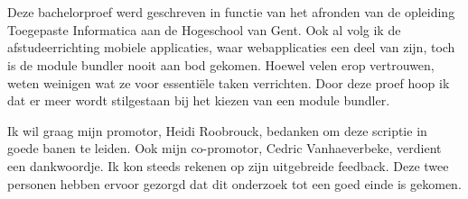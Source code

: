 
\chapter*{}
\label{ch:voorwoord}


Deze bachelorproef werd geschreven in functie van het afronden van de opleiding Toegepaste Informatica aan de Hogeschool van Gent. Ook al volg ik de afstudeerrichting mobiele applicaties, waar webapplicaties een deel van zijn, toch is de module bundler nooit aan bod gekomen. Hoewel velen erop vertrouwen, weten weinigen wat ze voor essentiële taken verrichten. Door deze proef hoop ik dat er meer wordt stilgestaan bij het kiezen van een module bundler. 

Ik wil graag mijn promotor, Heidi Roobrouck, bedanken om deze scriptie in goede banen te leiden. Ook mijn co-promotor, Cedric Vanhaeverbeke, verdient een dankwoordje. Ik kon steeds rekenen op zijn uitgebreide feedback. Deze twee personen hebben ervoor gezorgd dat dit onderzoek tot een goed einde is gekomen.
